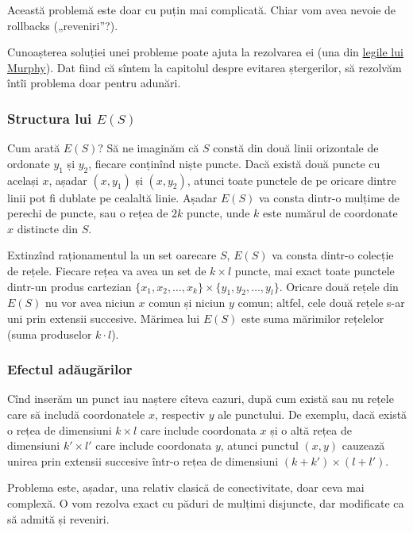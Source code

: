 \documentclass[../main.tex]{subfiles}
\begin{document}
Această problemă este doar cu puțin mai complicată. Chiar vom avea nevoie de rollbacks („reveniri”?).

Cunoașterea soluției unei probleme poate ajuta la rezolvarea ei (una din \href{https://www.cs.cmu.edu/~fgandon/miscellaneous/murphy/}{legile lui Murphy}). Dat fiind că sîntem la capitolul despre evitarea ștergerilor, să rezolvăm întîi problema doar pentru adunări.

\subsubsection*{Structura lui $E(S)$}

Cum arată $E(S)$? Să ne imaginăm că $S$ constă din două linii orizontale de ordonate $y_1$ și $y_2$, fiecare conținînd niște puncte. Dacă există două puncte cu același  $x$, așadar $(x, y_1)$ și $(x, y_2)$, atunci toate punctele de pe oricare dintre linii pot fi dublate pe cealaltă linie. Așadar $E(S)$ va consta dintr-o mulțime de perechi de puncte, sau o rețea de $2 k$ puncte, unde $k$ este numărul de coordonate $x$ distincte din $S$.

Extinzînd raționamentul la un set oarecare $S$, $E(S)$ va consta dintr-o colecție de rețele. Fiecare rețea va avea un set de $k \times l$ puncte, mai exact toate punctele dintr-un produs cartezian $\{x_1, x_2, \dots, x_k\} \times \{y_1, y_2, \dots, y_l\}$. Oricare două rețele din $E(S)$ nu vor avea niciun $x$ comun și niciun $y$ comun; altfel, cele două rețele s-ar uni prin extensii succesive. Mărimea lui $E(S)$ este suma mărimilor rețelelor (suma produselor $k \cdot l$).

\subsubsection*{Efectul adăugărilor}

Cînd inserăm un punct iau naștere cîteva cazuri, după cum există sau nu rețele care să includă coordonatele $x$, respectiv $y$ ale punctului. De exemplu, dacă există o rețea de dimensiuni $k \times l$ care include coordonata $x$ și o altă rețea de dimensiuni $k' \times l'$ care include coordonata $y$, atunci punctul $(x,y)$ cauzează unirea prin extensii succesive într-o rețea de dimensiuni $(k + k') \times (l + l')$.

Problema este, așadar, una relativ clasică de conectivitate, doar ceva mai complexă. O vom rezolva exact cu păduri de mulțimi disjuncte, dar modificate ca să admită și reveniri.
\end{document}
